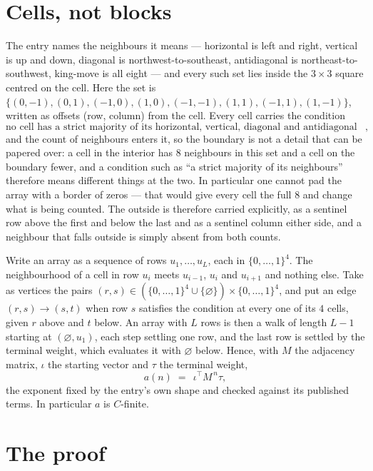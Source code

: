 \documentclass[11pt,a4paper]{article}
\theoremstyle{plain}
\theoremstyle{definition}
\begin{document}
\section{Cells, not blocks}

The entry names the neighbours it means --- horizontal is left and right, vertical is up and
down, diagonal is northwest-to-southeast, antidiagonal is northeast-to-southwest, king-move is
all eight --- and every such set lies inside the $3\times3$ square centred on the cell. Here
the set is $\{(0,-1), (0,1), (-1,0), (1,0), (-1,-1), (1,1), (-1,1), (1,-1)\}$, written as offsets (row, column) from the cell. Every cell carries
the condition
\[
\text{no cell has a strict majority of its horizontal, vertical, diagonal and antidiagonal neighbours equal to 1},
\]
and the count of neighbours enters it, so the boundary is not a detail that can be papered
over: a cell in the interior has $8$ neighbours in this set and a cell on the boundary
fewer, and a condition such as ``a strict majority of its neighbours'' therefore means
different things at the two. In particular one cannot pad the array with a border of zeros ---
that would give every cell the full $8$ and change what is being counted. The outside is
therefore carried
explicitly, as a sentinel row above the first and below the last and as a sentinel column
either side, and a neighbour that falls outside is simply absent from both counts.

Write an array as a sequence of rows $u_1,\dots,u_L$, each in
$\{0,\dots,1\}^{4}$. The neighbourhood of a cell in row $u_i$ meets $u_{i-1}$,
$u_i$ and $u_{i+1}$ and nothing else. Take as vertices the pairs
$(r,s)\in(\{0,\dots,1\}^{4}\cup\{\varnothing\})\times\{0,\dots,1\}^{4}$,
and put an edge $(r,s)\to(s,t)$ when row $s$ satisfies the condition at every one of its
$4$ cells, given $r$ above and $t$ below. An array with $L$ rows is then a walk of length
$L-1$ starting at $(\varnothing,u_1)$, each step settling one row, and the last row is
settled by the terminal weight, which evaluates it with $\varnothing$ below. Hence,
with $M$ the adjacency matrix, $\iota$ the starting vector and $\tau$ the terminal weight,
\[
a(n)\;=\;\,\iota^{\!\top}M^{\,n}\tau ,
\]
the exponent fixed by the entry's own shape and checked against its published terms. In
particular $a$ is $C$-finite.

\section{The proof}
\end{document}
